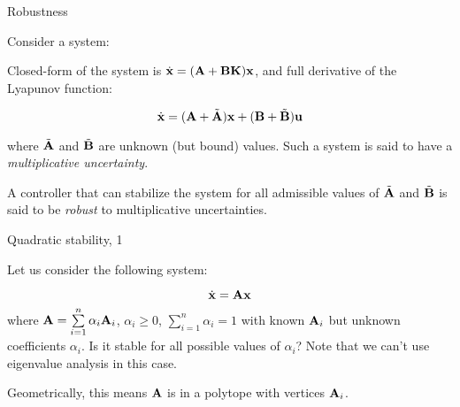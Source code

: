 \documentclass{beamer}
\begin{document}
	
	
	
	\begin{frame}{Robustness}
		\begin{flushleft}
			
			Consider a system:
			
			\bigskip
			
			Closed-form of the system is $\dot{\mathbf{x}} = (\mathbf{A} + \mathbf{B}\mathbf{K})\mathbf{x}$, and full derivative of the Lyapunov function:
			
			\begin{equation}
				\dot{\mathbf{x}} = (\mathbf{A} + \Tilde{\mathbf{A}})\mathbf{x} + (\mathbf{B} + \Tilde{\mathbf{B}})\mathbf{u}
			\end{equation}
			
			where $ \Tilde{\mathbf{A}}$ and $ \Tilde{\mathbf{B}}$ are unknown (but bound) values. Such a system is said to have a \emph{multiplicative uncertainty}. 
			
			\bigskip
			
			A controller that can stabilize the system for all admissible values of  $\Tilde{\mathbf{A}}$ and $ \Tilde{\mathbf{B}}$ is said to be \emph{robust} to multiplicative uncertainties.
			
		\end{flushleft}
	\end{frame}
	
	
	
	
	\begin{frame}{Quadratic stability, 1}
		\begin{flushleft}
			
			Let us consider the following system:
			
			\begin{equation}
				\dot{\mathbf{x}} = \mathbf{A}\mathbf{x}
			\end{equation}
			where $\mathbf{A} = \sum\limits_{i=1}^{n} \alpha_i \mathbf{A}_i$, $\alpha_i \geq 0$, $\sum\limits_{i=1}^{n} \alpha_i = 1$ with known $\mathbf{A}_i$ but unknown coefficients $\alpha_i$. Is it stable for all possible values of $\alpha_i$? Note that we can't use eigenvalue analysis in this case.
			
			\bigskip
			
			Geometrically, this means $\mathbf{A}$ is in a polytope with vertices $\mathbf{A}_i$.
			
		\end{flushleft}
	\end{frame}
	
	
	
\end{document}
